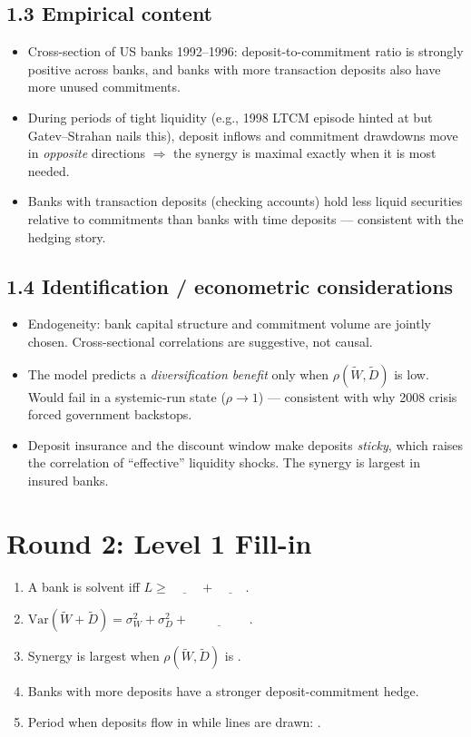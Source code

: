 \documentclass[11pt]{article}
\newcommand{\Var}{\mathrm{Var}}
\newcommand{\blank}[1]{\underline{\hspace{#1}}}
\begin{document}
\subsection*{1.3 Empirical content}
\begin{itemize}
\item Cross-section of US banks 1992--1996: deposit-to-commitment ratio is strongly positive across banks, and banks with more transaction deposits also have more unused commitments.
\item During periods of tight liquidity (e.g., 1998 LTCM episode hinted at but Gatev--Strahan nails this), deposit inflows and commitment drawdowns move in \emph{opposite} directions $\Rightarrow$ the synergy is maximal exactly when it is most needed.
\item Banks with transaction deposits (checking accounts) hold less liquid securities relative to commitments than banks with time deposits --- consistent with the hedging story.
\end{itemize}

\subsection*{1.4 Identification / econometric considerations}
\begin{alertbox}
\begin{itemize}
\item Endogeneity: bank capital structure and commitment volume are jointly chosen. Cross-sectional correlations are suggestive, not causal.
\item The model predicts a \emph{diversification benefit} only when $\rho(\tilde W,\tilde D)$ is low. Would fail in a systemic-run state ($\rho\to 1$) --- consistent with why 2008 crisis forced government backstops.
\item Deposit insurance and the discount window make deposits \emph{sticky}, which raises the correlation of ``effective'' liquidity shocks. The synergy is largest in insured banks.
\end{itemize}
\end{alertbox}

\section*{Round 2: Level 1 Fill-in}
\begin{enumerate}
\item A bank is solvent iff $L \ge \blank{1cm} + \blank{1cm}$.
\item $\Var(\tilde W + \tilde D) = \sigma_W^2 + \sigma_D^2 + \blank{2cm}$.
\item Synergy is largest when $\rho(\tilde W,\tilde D)$ is \blank{1.5cm}.
\item Banks with more \blank{1.5cm} deposits have a stronger deposit-commitment hedge.
\item Period when deposits flow in while lines are drawn: \blank{2cm}.
\end{enumerate}
\end{document}
